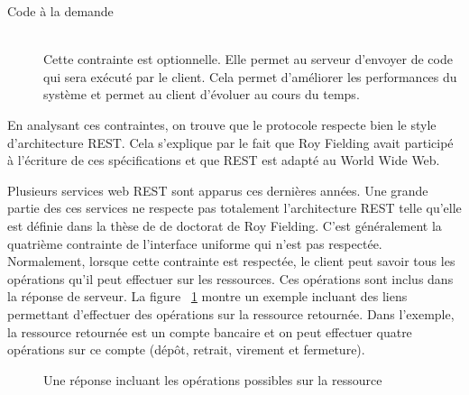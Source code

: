 \begin{description}
    \item[Code à la demande]\hfill\\ 
        Cette contrainte est optionnelle. Elle permet au serveur d'envoyer de code qui 
        sera exécuté par le client. Cela permet d'améliorer les performances du système 
        et permet au client d'évoluer au cours du temps.  \end{description}

En analysant ces contraintes, on trouve que le protocole 
respecte bien le style d'architecture REST. Cela s'explique par le fait que Roy
Fielding avait participé à l'écriture de ces spécifications et que REST est
adapté au World Wide Web.  

Plusieurs services web REST sont apparus ces dernières années. Une grande
partie des ces services ne respecte pas totalement l'architecture REST telle
qu'elle est définie dans la thèse de de doctorat de Roy Fielding. C'est
généralement la quatrième contrainte de l'interface uniforme qui n'est pas
respectée. Normalement, lorsque cette contrainte est respectée, le client peut
savoir tous les opérations qu'il peut effectuer sur les ressources. Ces
opérations sont inclus dans la réponse de serveur. La figure ~\ref{fig:hateoas}
montre un exemple incluant des liens permettant d'effectuer des opérations sur
la ressource retournée. Dans l'exemple, la ressource retournée est un compte
bancaire et on peut effectuer quatre opérations sur ce compte (dépôt, retrait,
virement et fermeture). 


\begin{figure}[htp] 
    \centering
    \caption{Une réponse incluant les opérations possibles sur la ressource} 
    \label{fig:hateoas} 
\end{figure}
